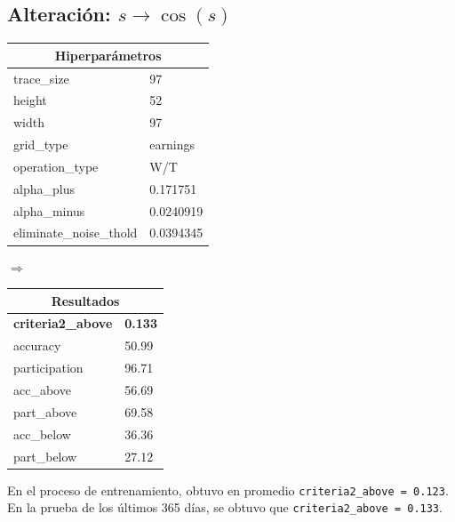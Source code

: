 \documentclass[11pt]{article}
\begin{document}
\subsection{Alteración: $s \to \cos(s)$}
\begin{table}[H]
    \centering
    \begin{tabular}{|ll|}
        \hline
        \multicolumn{2}{|c|}{Hiperparámetros} \\
        \hline
        trace\_size            &         97 \\
        height                &         52 \\
        width                 &         97 \\
        grid\_type             &   earnings \\
        operation\_type        &        W/T \\
        alpha\_plus            &   0.171751 \\
        alpha\_minus           &  0.0240919 \\
        eliminate\_noise\_thold &  0.0394345 \\
        \hline
        \end{tabular}
    $\Rightarrow$
    \begin{tabular}{|ll|}
        \hline
        \multicolumn{2}{|c|}{Resultados}\\
        \hline
        \textbf{criteria2\_above} & \textbf{0.133} \\
        accuracy            &         50.99 \\
        participation                &          96.71 \\
        acc\_above                 &         56.69 \\
        part\_above             &       69.58 \\
        acc\_below        &        36.36 \\
        part\_below            &     27.12 \\
        \hline
    \end{tabular}
\end{table}

En el proceso de entrenamiento, obtuvo en promedio \texttt{criteria2\_above = 0.123}. En la prueba de los últimos 365 días, se obtuvo que  \texttt{criteria2\_above = 0.133}.
\end{document}
